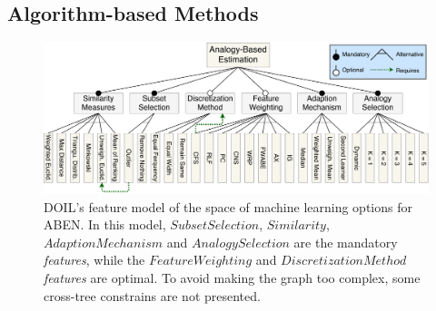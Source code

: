 \documentclass[10pt,conference]{IEEEtran}
\newcommand{\bi}{\begin{itemize}}
\newcommand{\ei}{\end{itemize}}
\begin{document}
\subsection{Algorithm-based Methods}

\begin{figure}[!t]
\centerline{\includegraphics[width=.8\textwidth]{FTM.pdf}}
\caption{DOIL's feature model of the space of machine learning options for ABEN.  In this model, $\mathit{Subset Selection}$, $\mathit{Similarity}$, $\mathit{Adaption Mechanism}$ and $\mathit{Analogy Selection}$ are the mandatory {\em features}, while the $\mathit{Feature Weighting}$ and $\mathit{Discretization Method}$ {\em features} are optimal. To avoid making the graph too complex, some cross-tree constrains are not presented.}    
\label{fig:featuretree}
\end{figure}

\end{document}
